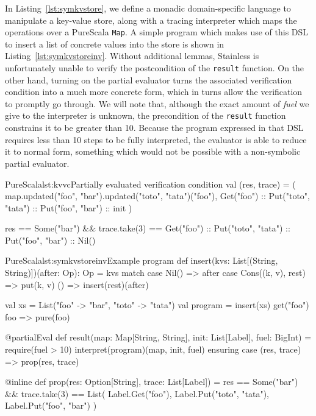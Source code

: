 \documentclass[a4paper,twoside]{article}
\newcommand{\RefCode}[1]{Listing~\ref{#1}}
\newcommand{\stt}[1]{\texttt{\small{#1}}}
\begin{document}
In \RefCode{lst:symkvstore}, we define a monadic domain-specific language to manipulate a key-value store, along with a tracing interpreter which maps the operations over a PureScala \stt{Map}. A simple program which makes use of this DSL to insert a list of concrete values into the store is shown in \RefCode{lst:symkvstoreinv}. Without additional lemmas, Stainless is unfortunately unable to verify the postcondition of the \stt{result} function. On the other hand, turning on the partial evaluator turns the associated verification condition into a much more concrete form, which in turns allow the verification to promptly go through. We will note that, although the exact amount of \textit{fuel} we give to the interpreter is unknown, the precondition of the \stt{result} function constrains it to be greater than 10. Because the program expressed in that DSL requires less than 10 steps to be fully interpreted, the evaluator is able to reduce it to normal form, something which would not be possible with a non-symbolic partial evaluator.

\begin{Code}{PureScala}{lst:kvvc}{Partially evaluated verification condition}
val (res, trace) = (
  map.updated("foo", "bar").updated("toto", "tata")("foo"),
  Get("foo") :: Put("toto", "tata") :: Put("foo", "bar") :: init
)

res == Some("bar") &&
trace.take(3) == Get("foo") :: Put("toto", "tata") :: Put("foo", "bar") :: Nil()
\end{Code}

\begin{Code}{PureScala}{lst:symkvstoreinv}{Example program}
def insert(kvs: List[(String, String)])(after: Op): Op = kvs match {
  case Nil() => after
  case Cons((k, v), rest) => put(k, v) { () => insert(rest)(after) }
}

val xs = List("foo" -> "bar", "toto" -> "tata")
val program = insert(xs) {
  get("foo") { foo =>
    pure(foo)
  }
}

@partialEval
def result(map: Map[String, String], init: List[Label], fuel: BigInt) = {
  require(fuel > 10)
  interpret(program)(map, init, fuel)
} ensuring { case (res, trace) => prop(res, trace) }

@inline
def prop(res: Option[String], trace: List[Label]) = {
  res == Some("bar") &&
  trace.take(3) == List(
    Label.Get("foo"),
    Label.Put("toto", "tata"),
    Label.Put("foo", "bar")
  )
}
\end{Code}
\end{document}
